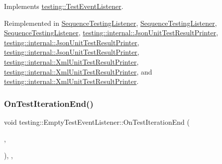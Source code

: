 Implements \mbox{\hyperlink{classtesting_1_1_test_event_listener_a550fdb3e55726e4cefa09f5697941425}{testing\+::\+Test\+Event\+Listener}}.



Reimplemented in \mbox{\hyperlink{class_sequence_testing_listener_a783bc01e2a95f5bf73bbde4d96832e0f}{Sequence\+Testing\+Listener}}, \mbox{\hyperlink{class_sequence_testing_listener_ae3a4e15e6c811a7b70992669d659e11e}{Sequence\+Testing\+Listener}}, \mbox{\hyperlink{class_sequence_testing_listener_ae3a4e15e6c811a7b70992669d659e11e}{Sequence\+Testing\+Listener}}, \mbox{\hyperlink{classtesting_1_1internal_1_1_json_unit_test_result_printer_a9716a1dd5a3608181748c1b6f039c365}{testing\+::internal\+::\+Json\+Unit\+Test\+Result\+Printer}}, \mbox{\hyperlink{classtesting_1_1internal_1_1_json_unit_test_result_printer_a9716a1dd5a3608181748c1b6f039c365}{testing\+::internal\+::\+Json\+Unit\+Test\+Result\+Printer}}, \mbox{\hyperlink{classtesting_1_1internal_1_1_json_unit_test_result_printer_a937dff300da12370b9dd0a0dd82a529a}{testing\+::internal\+::\+Json\+Unit\+Test\+Result\+Printer}}, \mbox{\hyperlink{classtesting_1_1internal_1_1_xml_unit_test_result_printer_abf972ca903d66d5ea52d9b1bc0a27f21}{testing\+::internal\+::\+Xml\+Unit\+Test\+Result\+Printer}}, \mbox{\hyperlink{classtesting_1_1internal_1_1_xml_unit_test_result_printer_abf972ca903d66d5ea52d9b1bc0a27f21}{testing\+::internal\+::\+Xml\+Unit\+Test\+Result\+Printer}}, and \mbox{\hyperlink{classtesting_1_1internal_1_1_xml_unit_test_result_printer_a37cf92d3953b2be56f9fcb049a68846c}{testing\+::internal\+::\+Xml\+Unit\+Test\+Result\+Printer}}.

\mbox{\label{classtesting_1_1_empty_test_event_listener_aae9c5c61e476f0c421402fb1dde434d2}} 
\subsubsection{\texorpdfstring{OnTestIterationEnd()}{OnTestIterationEnd()}\hspace{0.1cm}{\footnotesize\ttfamily [2/3]}}
{\footnotesize\ttfamily void testing\+::\+Empty\+Test\+Event\+Listener\+::\+On\+Test\+Iteration\+End (\begin{DoxyParamCaption}\item[{const \mbox{\hyperlink{classtesting_1_1_unit_test}{Unit\+Test}} \&}]{,  }\item[{int}]{ }\end{DoxyParamCaption})\hspace{0.3cm}{\ttfamily [inline]}, {\ttfamily [override]}, {\ttfamily [virtual]}}



